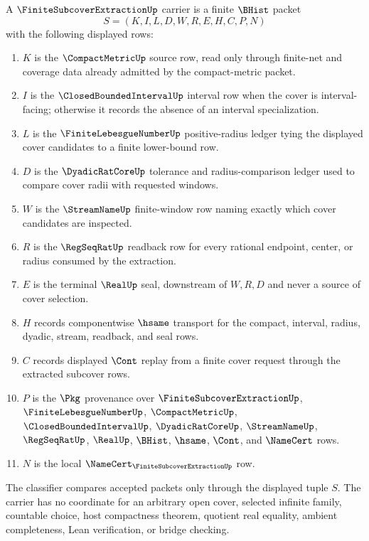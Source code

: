 \begin{definition}
\label{def:finite-subcover-extraction-carrier}
A $\FiniteSubcoverExtractionUp$ carrier is a finite $\BHist$ packet
$$
S=(K,I,L,D,W,R,E,H,C,P,N)
$$
with the following displayed rows:
\begin{enumerate}
\item $K$ is the $\CompactMetricUp$ source row, read only through finite-net and coverage data already admitted by the compact-metric packet.
\item $I$ is the $\ClosedBoundedIntervalUp$ interval row when the cover is interval-facing; otherwise it records the absence of an interval specialization.
\item $L$ is the $\FiniteLebesgueNumberUp$ positive-radius ledger tying the displayed cover candidates to a finite lower-bound row.
\item $D$ is the $\DyadicRatCoreUp$ tolerance and radius-comparison ledger used to compare cover radii with requested windows.
\item $W$ is the $\StreamNameUp$ finite-window row naming exactly which cover candidates are inspected.
\item $R$ is the $\RegSeqRatUp$ readback row for every rational endpoint, center, or radius consumed by the extraction.
\item $E$ is the terminal $\RealUp$ seal, downstream of $W,R,D$ and never a source of cover selection.
\item $H$ records componentwise $\hsame$ transport for the compact, interval, radius, dyadic, stream, readback, and seal rows.
\item $C$ records displayed $\Cont$ replay from a finite cover request through the extracted subcover rows.
\item $P$ is the $\Pkg$ provenance over $\FiniteSubcoverExtractionUp$, $\FiniteLebesgueNumberUp$, $\CompactMetricUp$, $\ClosedBoundedIntervalUp$, $\DyadicRatCoreUp$, $\StreamNameUp$, $\RegSeqRatUp$, $\RealUp$, $\BHist$, $\hsame$, $\Cont$, and $\NameCert$ rows.
\item $N$ is the local $\NameCert_{\FiniteSubcoverExtractionUp}$ row.
\end{enumerate}
The classifier compares accepted packets only through the displayed tuple $S$. The carrier has no coordinate for an arbitrary open cover, selected infinite family, countable choice, host compactness theorem, quotient real equality, ambient completeness, Lean verification, or bridge checking.
\end{definition}


